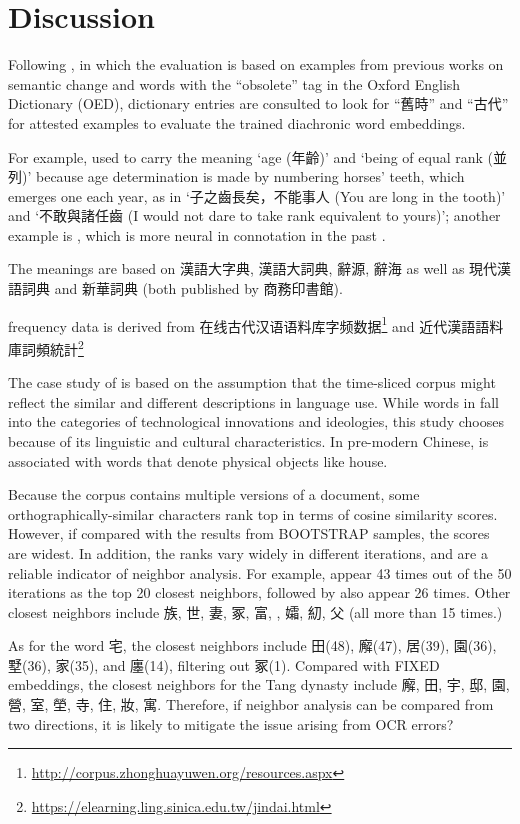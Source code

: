 

\chapter{Discussion}
Following \textcite{hamilton2016law}, in which the evaluation is based on examples from previous works on semantic change and words with the ``obsolete'' tag in the Oxford English Dictionary (OED), dictionary entries are consulted to look for ``舊時'' and ``古代'' for attested examples to evaluate the trained diachronic word embeddings.

For example,  used to carry the meaning `age (年齡)' and `being of equal rank (並列)' because age determination is made by numbering horses' teeth, which emerges one each year, as in `子之齒長矣，不能事人 (You are long in the tooth)' and `不敢與諸任齒 (I would not dare to take rank equivalent to yours)'; another example is , which is more neural in connotation in the past \parencite[前言]{王1997古}.

The meanings are based on 漢語大字典, 漢語大詞典, 辭源, 辭海 as well as 現代漢語詞典 and 新華詞典 (both published by 商務印書館).

frequency data is derived from 在线古代汉语语料库字频数据\footnote{\url{http://corpus.zhonghuayuwen.org/resources.aspx}} and 近代漢語語料庫詞頻統計\footnote{\url{https://elearning.ling.sinica.edu.tw/jindai.html}}

The case study of \jia is based on the assumption that the time-sliced corpus might reflect the similar and different descriptions in language use. While words in  fall into the categories of technological innovations and ideologies, this study chooses \jia because of its linguistic and cultural characteristics. In pre-modern Chinese, \jia is associated with words that denote physical objects like house.

Because the corpus contains multiple versions of a document, some orthographically-similar characters rank top in terms of cosine similarity scores. However, if compared with the results from \textsc{BOOTSTRAP} samples, the scores are widest. In addition, the ranks vary widely in different iterations, and are a reliable indicator of neighbor analysis. For example,  appear 43 times out of the 50 iterations as the top 20 closest neighbors, followed by  also appear 26 times. Other closest neighbors include 族, 世, 妻, 冢, 富, , 孀, 糿, 父 (all more than 15 times.)

As for the word 宅, the closest neighbors include 田(48), 廨(47), 居(39), 園(36), 墅(36), 家(35), and 廛(14), filtering out 冢(1). Compared with \textsc{FIXED} embeddings, the closest neighbors for the Tang dynasty include 廨, 田, 宇, 邸, 園, 營, 室, 塋, 寺, 住, 妝, 寓. Therefore, if neighbor analysis can be compared from two directions, it is likely to mitigate the issue arising from OCR errors?



